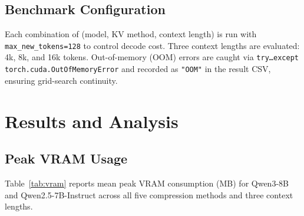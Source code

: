 \documentclass[10pt,twocolumn]{article}
\begin{document}
\subsection{Benchmark Configuration}

Each combination of (model, KV method, context length) is run with
\texttt{max\_new\_tokens=128} to control decode cost.
Three context lengths are evaluated: 4k, 8k, and 16k tokens.
Out-of-memory (OOM) errors are caught via
\texttt{try\ldots except torch.cuda.OutOfMemoryError} and recorded
as \texttt{"OOM"} in the result CSV, ensuring grid-search continuity.


\section{Results and Analysis}
\label{sec:results}

\subsection{Peak VRAM Usage}

Table~\ref{tab:vram} reports mean peak VRAM consumption (MB)
for Qwen3-8B and Qwen2.5-7B-Instruct across all five compression
methods and three context lengths.
\end{document}
